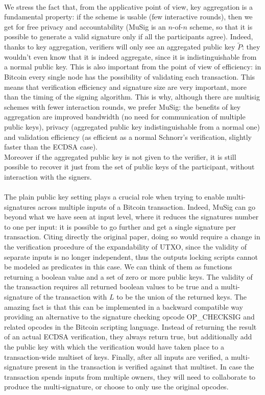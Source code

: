 \\
We stress the fact that, from the applicative point of view, key aggregation is a fundamental property: if the scheme is usable (few interactive rounds), then we get for free privacy and accountability (MuSig is an $n$-of-$n$ scheme, so that it is possible to generate a valid signature only if all the participants agree). Indeed, thanks to key aggregation, verifiers will only see an aggregated public key $\tilde{P}$: they wouldn't even know that it is indeed aggregate, since it is indistinguishable from a normal public key. This is also important from the point of view of efficiency: in Bitcoin every single node has the possibility of validating each transaction. This means that verification efficiency and signature size are very important, more than the timing of the signing algorithm. This is why, although there are multisig schemes with fewer interaction rounds, we prefer MuSig: the benefits of key aggregation are improved bandwidth (no need for communication of multiple public keys), privacy (aggregated public key indistinguishable from a normal one) and validation efficiency (as efficient as a normal Schnorr's verification, slightly faster than the ECDSA case).
\\
Moreover if the aggregated public key is not given to the verifier, it is still possible to recover it just from the set of public keys of the participant, without interaction with the signers.
\\
\\
The plain public key setting plays a crucial role when trying to enable multi-signatures across multiple inputs of a Bitcoin transaction. Indeed, MuSig can go beyond what we have seen at input level, where it reduces the signatures number to one per input: it is possible to go further and get a single signature per transaction. Citing directly the original paper, doing so would require a change in the verification procedure of the expandability of UTXO, since the validity of separate inputs is no longer independent, thus the outputs locking scripts cannot be modeled as predicates in this case. We can think of them as functions returning a boolean value and a set of zero or more public keys. The validity of the transaction requires all returned boolean values to be true and a multi-signature of the transaction with $L$ to be the union of the returned keys. The amazing fact is that this can be implemented in a backward compatible way providing an alternative to the signature checking opcode OP\_CHECKSIG and related opcodes in the Bitcoin scripting language. Instead of returning the result of an actual ECDSA verification, they always return true, but additionally add the public key with which the verification would have taken place to a transaction-wide multiset of keys. Finally, after all inputs are verified, a multi-signature present in the transaction is verified against that multiset. In case the transaction spends inputs from multiple owners, they will need to collaborate to produce the multi-signature, or choose to only use the original opcodes. 
